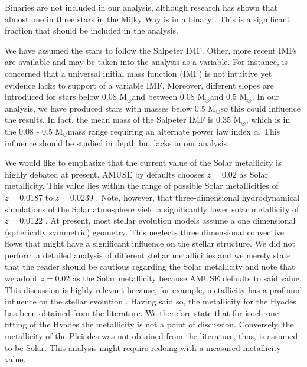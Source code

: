 \documentclass{aa}
\newcommand{\Sun}[0]{\ensuremath{_{\odot}}}
\begin{document}
Binaries are not included in our analysis, although research has shown that almost one in three stars in the Milky Way is in a binary \citep{2006ApJ...640L..63L}. This is a significant fraction that should be included in the analysis.

We have assumed the stars to follow the Salpeter IMF. Other, more recent IMFs are available \citep[e.g.][]{1979ApJS...41..513M, 2001ASPC..228..187K, 2001MNRAS.322..231K} and may be taken into the analysis as a variable.
For instance, \citet{2001MNRAS.322..231K} is concerned that a universal initial mass function (IMF) is not intuitive yet evidence lacks to support of a variable IMF. Moreover, different slopes are introduced for stars below 0.08 M\Sun and between 0.08 M\Sun and 0.5 M\Sun. In our analysis, we have produced stars with masses below 0.5 M\Sun so this could influence the results. In fact, the mean mass of the Salpeter IMF is 0.35 M\Sun, which is in the 0.08 - 0.5 M\Sun mass range requiring an alternate power law index $\alpha$. This influence should be studied in depth but lacks in our analysis.

We would like to emphasize that the current value of the Solar metallicity is highly debated at present. AMUSE by defaults chooses $z = 0.02$ as Solar metallicity. This value lies within the range of possible Solar metallicities of $z= 0.0187$ to $z = 0.0239$ \citep{2007ApJ...670..872C}. Note, however, that three-dimensional hydrodynamical simulations of the Solar atmosphere yield a significantly lower solar metallicity of $z = 0.0122$ \citep{2006CoAst.147...76A}. At present, most stellar evolution models assume a one dimensional (spherically symmetric) geometry. This neglects three dimensional convective flows that might have a significant influence on the stellar structure. We did not perform a detailed analysis of different stellar metallicities and we merely state that the reader should be cautious regarding the Solar metallicity and note that we adopt $z = 0.02$ as the Solar metallicity because AMUSE defaults to said value. This discussion is highly relevant because, for example, metallicity has a profound influence on the stellar evolution \citep[e.g.][]{1960ApJ...131..598S}. Having said so, the metallicity for the Hyades has been obtained from the literature. We therefore state that for isochrone fitting of the Hyades the metallicity is not a point of discussion. Conversely, the metallicity of the Pleiades was not obtained from the literature, thus, is assumed to be Solar. This analysis might require redoing with a measured metallicity value.
\end{document}
